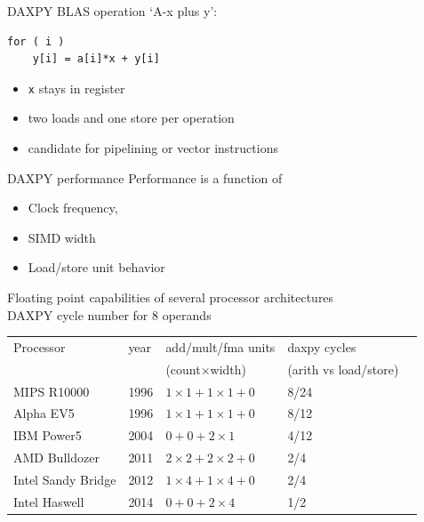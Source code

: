 \begin{numberedframe}{DAXPY}
  BLAS operation `A-x plus y':
\begin{lstlisting}
for ( i )
    y[i] = a[i]*x + y[i]
\end{lstlisting}
\begin{itemize}
\item \lstinline{x} stays in register
\item two loads and one store per operation
\item candidate for pipelining or vector instructions
\end{itemize}
\end{numberedframe}
\begin{numberedframe}{DAXPY performance}
\small
Performance is a function of
\begin{itemize}
\item Clock frequency,
\item SIMD width
\item Load/store unit behavior
\end{itemize}

Floating point capabilities of several processor architectures\\
 DAXPY cycle number for 8 operands  

  \begin{tabular}{lllll}
Processor&year&add/mult/fma units  &daxpy cycles\\
         &    &(count$\times$width)&(arith vs load/store)\\
\toprule
MIPS R10000       &1996 &$1\times1+1\times1+0$ &8/24 \\
Alpha EV5         &1996 &$1\times1+1\times1+0$ &8/12 \\
IBM Power5        &2004 &$0+0+2\times1       $ &4/12 \\
AMD Bulldozer     &2011 &$2\times2+2\times2+0$ &2/4  \\
Intel Sandy Bridge&2012 &$1\times4+1\times4+0$ &2/4  \\
Intel Haswell     &2014 &$0+0+2\times 4      $ &1/2  \\
  \end{tabular}
\end{numberedframe}

